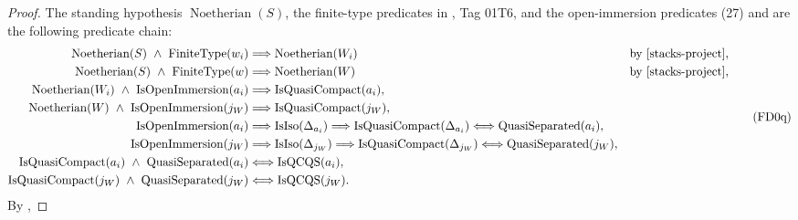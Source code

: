 \begin{proof}
  The standing hypothesis $\operatorname{Noetherian}(S)$, the finite-type
  predicates in ,
  Tag 01T6, and the open-immersion
  predicates (27) and  are the
  following predicate chain:
  \[
  \begin{aligned}
    \operatorname{Noetherian}(S)\ \wedge\
      \operatorname{FiniteType}(w_i)
      &\Longrightarrow\operatorname{Noetherian}(W_i)
        &&\text{by \cite[Tag 01T6]{stacks-project}},\\
    \operatorname{Noetherian}(S)\ \wedge\
      \operatorname{FiniteType}(w)
      &\Longrightarrow\operatorname{Noetherian}(W)
        &&\text{by \cite[Tag 01T6]{stacks-project}},\\
    \operatorname{Noetherian}(W_i)\ \wedge\
      \operatorname{IsOpenImmersion}(a_i)
      &\Longrightarrow\operatorname{IsQuasiCompact}(a_i),\\
    \operatorname{Noetherian}(W)\ \wedge\
      \operatorname{IsOpenImmersion}(j_W)
      &\Longrightarrow\operatorname{IsQuasiCompact}(j_W),\\
    \operatorname{IsOpenImmersion}(a_i)
      &\Longrightarrow\operatorname{IsIso}(\Delta_{a_i})
       \Longrightarrow\operatorname{IsQuasiCompact}(\Delta_{a_i})
       \Longleftrightarrow\operatorname{QuasiSeparated}(a_i),\\
    \operatorname{IsOpenImmersion}(j_W)
      &\Longrightarrow\operatorname{IsIso}(\Delta_{j_W})
       \Longrightarrow\operatorname{IsQuasiCompact}(\Delta_{j_W})
       \Longleftrightarrow\operatorname{QuasiSeparated}(j_W),\\
    \operatorname{IsQuasiCompact}(a_i)\ \wedge\
      \operatorname{QuasiSeparated}(a_i)
      &\Longleftrightarrow\operatorname{IsQCQS}(a_i),\\
    \operatorname{IsQuasiCompact}(j_W)\ \wedge\
      \operatorname{QuasiSeparated}(j_W)
      &\Longleftrightarrow\operatorname{IsQCQS}(j_W).
  \end{aligned}                                                    \tag{FD0q}
  \]
  By ,

\end{proof}
